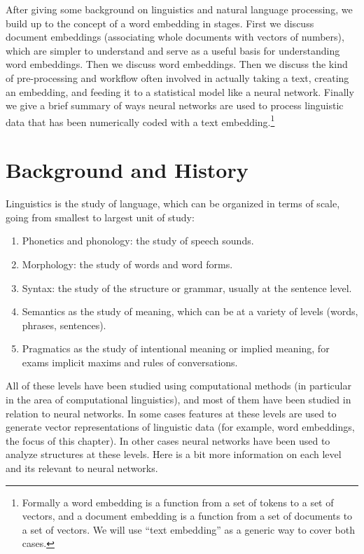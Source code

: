 After giving some background on linguistics and natural language processing, we build up to the concept of a word embedding in stages. First we discuss document embeddings (associating whole documents with vectors of numbers), which are simpler to understand and serve as a useful basis for understanding word embeddings. Then we discuss word embeddings. Then we discuss the kind of pre-processing and workflow often involved in actually taking a text, creating an embedding, and feeding it to a statistical model like a neural network. Finally we give a brief summary of ways neural networks are used to process linguistic data that has been numerically coded with a text embedding.\footnote{Formally a word embedding is a function from a set of tokens to a set of vectors, and a document embedding is a function from a set of documents to a set of vectors.  We will use ``text embedding'' as a generic way to cover both cases.}

\section{Background and History}

Linguistics is the study of language, which can be organized in terms of scale, going from smallest to largest unit of study: 
\begin{enumerate}
\item Phonetics and phonology: the study of speech sounds.
\item Morphology: the study of words and word forms.
\item Syntax: the study of the structure or grammar, usually at the sentence level.
\item Semantics as the study of meaning, which can be at a variety of levels (words, phrases, sentences).
\item Pragmatics as the study of intentional meaning or implied meaning, for exams implicit maxims and rules of conversations. 
\end{enumerate}


All of these levels have been studied using computational methods (in particular in the area of computational linguistics), and most of them have been studied in relation to neural networks. In some cases features at these levels are used to generate vector representations of linguistic data (for example, word embeddings, the focus of this chapter).  In other cases neural networks have been used to analyze structures at these levels. Here is a bit more information on each level and its relevant to neural networks.

